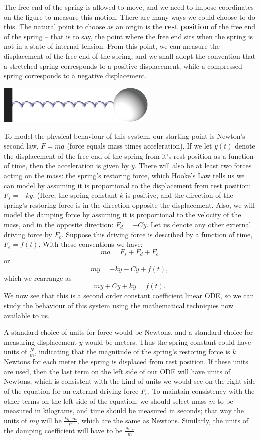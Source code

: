 \documentclass[12pt,letterpaper,twoside]{amsart}
\begin{document}
The free end of the spring is allowed to move, and we need to impose coordinates on the figure to measure this motion.  There are many ways we could choose to do this.  The natural point to choose as an origin is the {\bf rest position} of the free end of the spring -- that is to say, the point where the free end sits when the spring is not in a state of internal tension.  From this point, we can measure the displacement of the free end of the spring, and we shall adopt the convention that a stretched spring corresponds to a positive displacement, while a compressed spring corresponds to a negative displacement.

\begin{center}
\includegraphics[width=3in]{springmass2.eps}
\end{center}

To model the physical behaviour of this system, our starting point is Newton's second law, $F=ma$ (force equals mass times acceleration).  If we let $y(t)$ denote the displacement of the free end of the spring from it's rest position as a function of time, then the acceleration is given by $\ddot{y}$.  There will also be at least two forces acting on the mass: the spring's restoring force, which Hooke's Law tells us we can model by assuming it is proportional to the displacement from rest position: $F_s = -ky$.  (Here, the spring constant $k$ is positive, and the direction of the spring's restoring force is in the direction opposite the displacement.  Also, we will model the damping force by assuming it is proportional to the velocity of the mass, and in the opposite direction: $F_d = -C\dot{y}$.  Let us denote any other external driving force by $F_e$.  Suppose this driving force is described by a function of time, $F_e=f(t)$.  With these conventions we have:
\[ ma=F_s+F_d+F_e\]
or
\[ m \ddot{y} = -ky - C \dot{y}+f(t),\]
which we rearrange as
\[ m \ddot{y} + C \dot{y} + k y = f(t).\]
We now see that this is a second order constant coefficient linear ODE, so we can study the behaviour of this system using the mathematical techniques now available to us.  

A standard choice of units for force would be Newtons, and a standard choice for measuring displacement $y$ would be meters.  Thus the spring constant could have units of $\frac{N}{m}$, indicating that the magnitude of the spring's restoring force is $k$ Newtons for each meter the spring is displaced from rest position.  If these units are used, then the last term on the left side of our ODE will have units of Newtons, which is consistent with the kind of units we would see on the right side of the equation for an external driving force $F_e$.  To maintain consistency with the other terms on the left side of the equation, we should select mass $m$ to be measured in kilograms, and time should be measured in seconds; that way the units of $m\ddot{y}$ will be $\frac{kg \cdot m}{s^2}$, which are the same as Newtons.  Similarly, the units of the damping coefficient will have to be $\frac{N \cdot s}{m}$.
\end{document}
